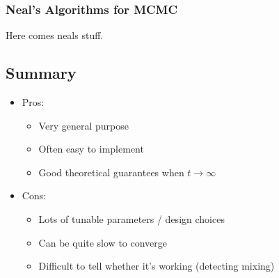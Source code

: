 \documentclass{article}
\begin{document}
\subsubsection{Neal's Algorithms for MCMC}

Here comes neals stuff.        
        
\subsection{Summary}
\begin{itemize}
    \item Pros:
    \begin{itemize}
        \item Very general purpose
        \item Often easy to implement
        \item Good theoretical guarantees when $t \rightarrow \infty$
    \end{itemize}
    \item Cons:
    \begin{itemize}
        \item Lots of tunable parameters / design choices
        \item Can be quite slow to converge
        \item Difficult to tell whether it's working (detecting mixing)
    \end{itemize}
\end{itemize}
\end{document}

